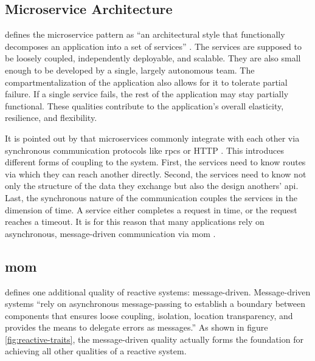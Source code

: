 \subsection{Microservice Architecture}

\citeauthor{richardson_microservices_2019} defines the microservice pattern as \enquote{an architectural style that functionally decomposes an application into a set of services} \parencite[11]{richardson_microservices_2019}.
The services are supposed to be loosely coupled, independently deployable, and scalable.
They are also small enough to be developed by a single, largely autonomous team.
The compartmentalization of the application also allows for it to tolerate partial failure.
If a single service fails, the rest of the application may stay partially functional.
\parencite[14f.]{richardson_microservices_2019}
These qualities contribute to the application's overall elasticity, resilience, and flexibility.

It is pointed out by \citeauthor{fowler_microservices_2014} that microservices commonly integrate with each other via synchronous communication protocols like \glspl{rpc} or HTTP \parencite{fowler_microservices_2014}.
This introduces different forms of coupling to the system.
First, the services need to know routes via which they can reach another directly.
Second, the services need to know not only the structure of the data they exchange but also the design anothers' \gls{api}.
Last, the synchronous nature of the communication couples the services in the dimension of time.
A service either completes a request in time, or the request reaches a timeout.
It is for this reason that many applications rely on asynchronous, message-driven communication via \gls{mom} \parencite{fowler_microservices_2014}.

\subsection{\acrlong{mom}}

\cite{boner_reactive_2014} defines one additional quality of reactive systems: message-driven.
Message-driven systems \enquote{rely on asynchronous message-passing to
establish a boundary between components that ensures loose coupling, isolation,
location transparency, and provides the means to delegate errors as messages.} \parencite{boner_reactive_2014}
As shown in figure \ref{fig:reactive-traits}, the message-driven quality actually forms the foundation for achieving all other qualities of a reactive system.

